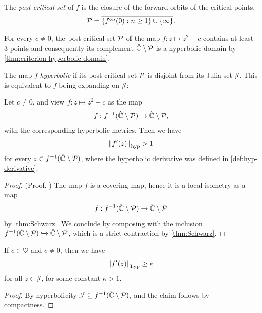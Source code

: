 \begin{definition}
	The \emph{post-critical set} of $f$ is the closure of the forward orbits 
	of the critical points,
	\begin{equation*}
		\operatorname{\mathcal P} = \overline{\{f^{\circ n} (0): n \geq 1\} \cup \{\infty\}}.
	\end{equation*}	
\end{definition}
For every $c \neq 0$, the post-critical set $\operatorname{\mathcal P}$ of the map $f: z\mapsto z^2+c$ contains at least $3$ points 
and consequently its complement $\hat{\mathbb C} \setminus \operatorname{\mathcal P}$
is a hyperbolic domain by \cref{thm:criterion-hyperbolic-domain}.

The map $f$ \emph{hyperbolic} if
 its post-critical set $\operatorname{\mathcal P}$ is disjoint from its Julia set $\mathcal J$.
 This is equivalent to $f$ being expanding on $\mathcal J$:

 \begin{theorem}\label{theorem:hyperbolic_expanding}
Let $c \neq0$, and view $f: z\mapsto z^2+c$ as the map 
$$f: f^{-1}(\hat {\mathbb C} \setminus \operatorname{\mathcal P}) \to \hat {\mathbb C} \setminus \operatorname{\mathcal P},$$
with the corresponding hyperbolic metrics. Then we have 
\begin{equation}\label{eq:hyp-derivative-bound}
	\left\Vert f'(z)\right\Vert_\mathrm{hyp} > 1
\end{equation} 
for every $z\in f^{-1}(\hat {\mathbb C} \setminus \operatorname{\mathcal P})$,
where the hyperbolic derivative was defined in \cref{def:hyp-derivative}.
 \end{theorem}
 
 \begin{proof}{(Proof. \cite[Theorem 19.1]{milnor_book})}
	The map $f$ is a covering map, hence it is a local isometry as a map
	$$f: f^{-1}(\hat {\mathbb C} \setminus \operatorname{\mathcal P}) \to \hat {\mathbb C} \setminus \operatorname{\mathcal P}$$
	by \cref{thm:Schwarz}.
	We conclude by composing with the inclusion 
	$f^{-1}(\hat {\mathbb C} \setminus \operatorname{\mathcal P}) \xhookrightarrow{} 
	\hat {\mathbb C} \setminus \operatorname{\mathcal P}$, 
	which is a strict contraction by \cref{thm:Schwarz}.
 \end{proof}

\begin{corollary}
	If $c \in \heartsuit$ and $c \neq 0$, then we have 
	\begin{equation}
		\left\Vert f'(z)\right\Vert_\mathrm{hyp} \geq \kappa
	\end{equation} 
	for all $z \in \mathcal J$, for some constant $\kappa >1$.
\end{corollary}
\begin{proof}
	By hyperbolicity 
	$ \mathcal J \subseteq f^{-1}(\hat {\mathbb C} \setminus \operatorname{\mathcal P})$, 
	and the claim follows by compactness.
\end{proof} 
 
